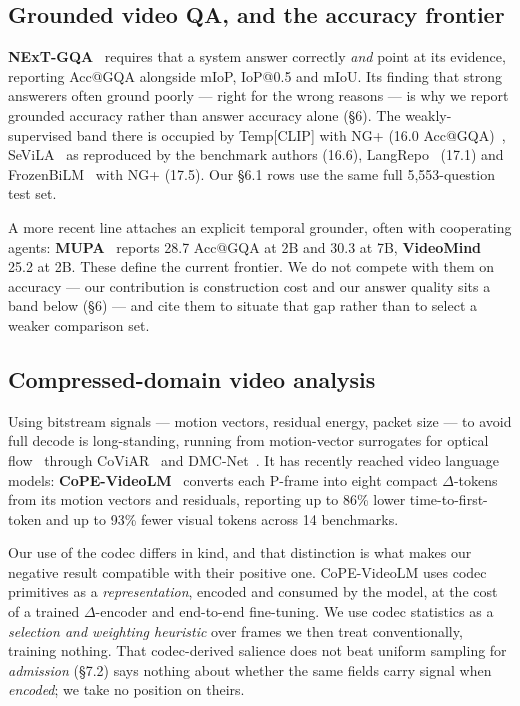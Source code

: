 \documentclass[sigconf,review,anonymous]{acmart}
\begin{document}
\subsection{Grounded video QA, and the accuracy frontier}

\textbf{NExT-GQA}~\cite{xiao2024nextgqa} requires that a system answer correctly \emph{and} point at its
evidence, reporting Acc@GQA alongside mIoP, IoP@0.5 and mIoU. Its finding that strong
answerers often ground poorly --- right for the wrong reasons --- is why we report grounded
accuracy rather than answer accuracy alone (§6). The weakly-supervised band there is occupied
by Temp{[}CLIP{]} with NG+ (16.0 Acc@GQA)~\cite{xiao2024nextgqa}, SeViLA~\cite{yu2023sevila} as reproduced by the benchmark authors (16.6),
LangRepo~\cite{kahatapitiya2024langrepo} (17.1) and FrozenBiLM~\cite{yang2022frozenbilm} with NG+ (17.5). Our §6.1 rows use the same full
5,553-question test set.

A more recent line attaches an explicit temporal grounder, often with cooperating agents:
\textbf{MUPA}~\cite{dang2025mupa} reports 28.7 Acc@GQA at 2B and 30.3 at 7B, \textbf{VideoMind}~\cite{liu2025videomind} 25.2 at 2B. These define
the current frontier. We do not compete with them on accuracy --- our contribution is
construction cost and our answer quality sits a band below (§6) --- and cite them to situate
that gap rather than to select a weaker comparison set.

\subsection{Compressed-domain video analysis}

Using bitstream signals --- motion vectors, residual energy, packet size --- to avoid full decode
is long-standing, running from motion-vector surrogates for optical flow~\cite{zhang2016mvcnn}
through CoViAR~\cite{wu2018coviar} and DMC-Net~\cite{shou2019dmcnet}. It has recently reached video language models:
\textbf{CoPE-VideoLM}~\cite{sarkar2026cope} converts each P-frame into eight compact \ensuremath{\Delta}-tokens from
its motion vectors and residuals, reporting up to 86\% lower time-to-first-token and up to 93\%
fewer visual tokens across 14 benchmarks.

Our use of the codec differs in kind, and that distinction is what makes our negative result
compatible with their positive one. CoPE-VideoLM uses codec primitives as a \emph{representation},
encoded and consumed by the model, at the cost of a trained \ensuremath{\Delta}-encoder and end-to-end
fine-tuning. We use codec statistics as a \emph{selection and weighting heuristic} over frames we
then treat conventionally, training nothing. That codec-derived salience does not beat
uniform sampling for \emph{admission} (§7.2) says nothing about whether the same fields carry
signal when \emph{encoded}; we take no position on theirs.
\end{document}
